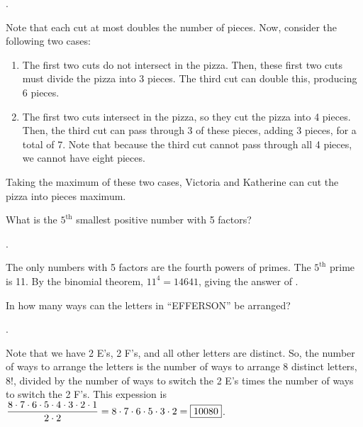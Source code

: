 \documentclass[11pt]{article}
\DeclareRobustCommand{\frac}[3][0pt]{%
  {\begingroup\hspace{#1}#2\hspace{#1}\endgroup\over\hspace{#1}#3\hspace{#1}}}
\begin{document}
\begin{answer} . \end{answer}
\begin{solution}
Note that each cut at most doubles the number of pieces. Now, consider the following two cases:
\begin{enumerate}
\item The first two cuts do not intersect in the pizza. Then, these first two cuts must divide the pizza into 3 pieces. The third cut can double this, producing 6 pieces.
\item The first two cuts intersect in the pizza, so they cut the pizza into 4 pieces. Then, the third cut can pass through 3 of these pieces, adding 3 pieces, for a total of 7. Note that because the third cut cannot pass through all 4 pieces, we cannot have eight pieces.
\end{enumerate}
Taking the maximum of these two cases, Victoria and Katherine can cut the pizza into  pieces maximum.
\end{solution}

\begin{problem} What is the  $5^{\text{th}}$ smallest positive number with 5 factors?
\end{problem}

\begin{answer} . \end{answer}
\begin{solution}
The only numbers with 5 factors are the fourth powers of primes. The $5^{\text{th}}$ prime is 11. By the binomial theorem, $11^4 = 14641$, giving the answer of .
\end{solution}

\begin{problem} In how many ways can the letters in ``EFFERSON'' be arranged?
\end{problem}

\begin{answer} . \end{answer}
\begin{solution}
Note that we have 2 E's, 2 F's, and all other letters are distinct. So, the number of ways to arrange the letters is the number of ways to arrange 8 distinct letters, 8!, divided by the number of ways to switch the 2 E's times the number of ways to switch the 2 F's. This expession is $\displaystyle \frac{8 \cdot 7 \cdot 6 \cdot 5 \cdot 4 \cdot 3 \cdot 2 \cdot 1}{2 \cdot 2} = 8 \cdot 7 \cdot 6 \cdot 5 \cdot 3 \cdot 2 = \boxed{10080}$.
\end{solution}
\end{document}
